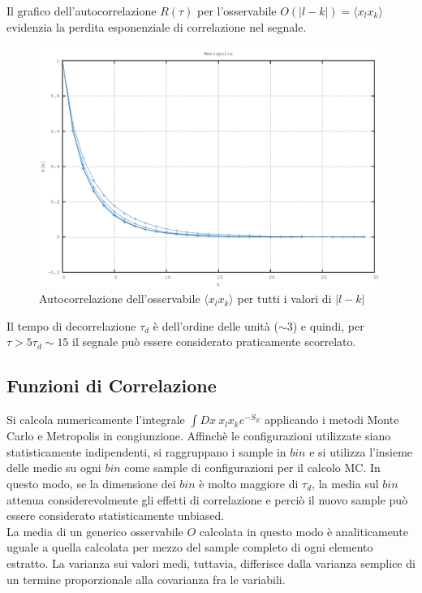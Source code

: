 Il grafico dell'autocorrelazione $R(\tau)$ per l'osservabile $O(|l-k|)=\langle x_lx_k\rangle$ evidenzia la perdita esponenziale di correlazione nel segnale.
\begin{figure}[H]
\centering
\includegraphics[width=\textwidth]{autocorrelation}
\caption{Autocorrelazione dell'osservabile $\langle x_lx_k\rangle$ per tutti i valori di $|l-k|$}
\label{fig:autocorrelation}
\end{figure}
Il tempo di decorrelazione $\tau_d$ è dell'ordine delle unità ($\sim3$) e quindi, per $\tau>5\tau_d\sim15$ il segnale può essere considerato praticamente scorrelato.
\newpage
\subsection{Funzioni di Correlazione}

Si calcola numericamente l'integrale $\int Dx \ x_lx_ke^{-S_E}$ applicando i metodi Monte Carlo e Metropolis in congiunzione. Affinchè le configurazioni utilizzate siano statisticamente indipendenti, si raggruppano i sample in $bin$ e si utilizza l'insieme delle medie su ogni $bin$ come sample di configurazioni per il calcolo MC. In questo modo, se la dimensione dei $bin$ è molto maggiore di $\tau_d$, la media sul $bin$ attenua considerevolmente gli effetti di correlazione e perciò il nuovo sample può essere considerato statisticamente unbiased.
\\

La media di un generico osservabile $O$ calcolata in questo modo è analiticamente uguale a quella calcolata per mezzo del sample completo di ogni elemento estratto. La varianza sui valori medi, tuttavia, differisce dalla varianza semplice di un termine proporzionale alla covarianza fra le variabili.


